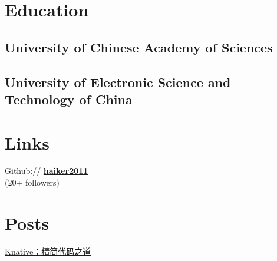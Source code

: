 \documentclass[]{deedy-resume-openfont}
\begin{document}
%
%
\lastupdated

%
%

%
%

\begin{minipage}[t]{0.25\textwidth} 


\section{Education} 

\subsection{University of Chinese Academy of Sciences}
\sectionsep

\subsection{University of Electronic Science and Technology of China}
\sectionsep


\section{Links}
\sectionsep   
Github:// \href{https://github.com/haiker2011}{\bf haiker2011} \\
(20+ followers) \\

\section{Posts}
\sectionsep
\href{http://www.servicemesher.com/blog/knative-whittling-down-the-code/}{Knative：精简代码之道} \\


\end{minipage}
\end{document}
